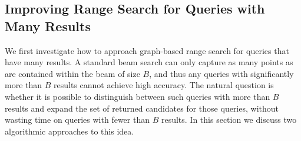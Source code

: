 %	
%	
%		
%		



\subsection{Improving Range Search for Queries with Many Results}

We first investigate how to approach graph-based range search for queries that have many results. A standard beam search can only capture as many points as are contained within the beam of size $B$, and thus any queries with significantly more than $B$ results cannot achieve high accuracy. The natural question is whether it is possible to distinguish between such queries with more than $B$ results and expand the set of returned candidates for those queries, without wasting time on queries with fewer than $B$ results. In this section we discuss two algorithmic approaches to this idea.


